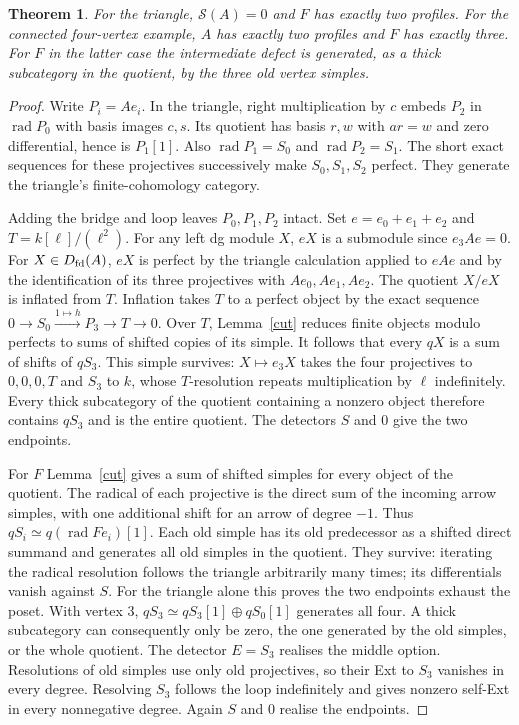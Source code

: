\documentclass[11pt]{article}
\newtheorem{thm}{Theorem}
\newcommand{\Dfd}{D_{\rm fd}}
\newcommand{\rad}{\operatorname{rad}}
\newcommand{\sg}{\mathcal S}
\begin{document}
\begin{thm}\label{triangle}
For the triangle, $\sg(A)=0$ and $F$ has exactly two profiles.
For the connected four-vertex example, $A$ has exactly two profiles
and $F$ has exactly three. For $F$ in the latter case the intermediate
defect is generated, as a thick subcategory in the quotient, by the
three old vertex simples.
\end{thm}
\begin{proof}
Write $P_i=Ae_i$. In the triangle, right multiplication by $c$ embeds
$P_2$ in $\rad P_0$ with basis images $c,s$. Its quotient has basis
$r,w$ with $ar=w$ and zero differential, hence is $P_1[1]$.
Also $\rad P_1=S_0$ and $\rad P_2=S_1$. The short exact sequences for
these projectives successively make $S_0,S_1,S_2$ perfect. They generate
the triangle's finite-cohomology category.

Adding the bridge and loop leaves $P_0,P_1,P_2$ intact. Set
$e=e_0+e_1+e_2$ and $T=k[\ell]/(\ell^2)$. For any left dg module $X$,
$eX$ is a submodule since $e_3Ae=0$. For $X\in\Dfd(A)$, $eX$ is perfect
by the triangle calculation applied to $eAe$ and by the identification
of its three projectives with $Ae_0,Ae_1,Ae_2$. The quotient $X/eX$
is inflated from $T$. Inflation takes $T$ to a perfect object by the exact
sequence $0\to S_0\xrightarrow{1\mapsto h}P_3\to T\to0$. Over $T$,
Lemma~\ref{cut} reduces finite objects modulo perfects to sums of shifted
copies of its simple. It follows that every $qX$ is a sum of shifts of
$qS_3$. This simple survives: $X\mapsto e_3X$ takes the four projectives
to $0,0,0,T$ and $S_3$ to $k$, whose $T$-resolution repeats multiplication
by $\ell$ indefinitely. Every thick subcategory of the quotient containing
a nonzero object therefore contains $qS_3$ and is the entire quotient.
The detectors $S$ and $0$ give the two endpoints.

For $F$ Lemma~\ref{cut} gives a sum of shifted simples for every object
of the quotient. The radical of each projective is the direct sum of
the incoming arrow simples, with one additional shift for an arrow of
degree $-1$. Thus $qS_i\simeq q(\rad Fe_i)[1]$. Each old simple has its
old predecessor as a shifted direct summand and generates all old simples
in the quotient. They survive: iterating the radical resolution follows
the triangle arbitrarily many times; its differentials vanish against
$S$. For the triangle alone this proves the two endpoints exhaust the
poset. With vertex 3, $qS_3\simeq qS_3[1]\oplus qS_0[1]$ generates all
four. A thick subcategory can consequently only be zero, the one generated
by the old simples, or the whole quotient. The detector $E=S_3$ realises
the middle option. Resolutions of old simples use only old projectives,
so their Ext to $S_3$ vanishes in every degree. Resolving $S_3$ follows
the loop indefinitely and gives nonzero self-Ext in every nonnegative
degree. Again $S$ and $0$ realise the endpoints.
\end{proof}
\end{document}
